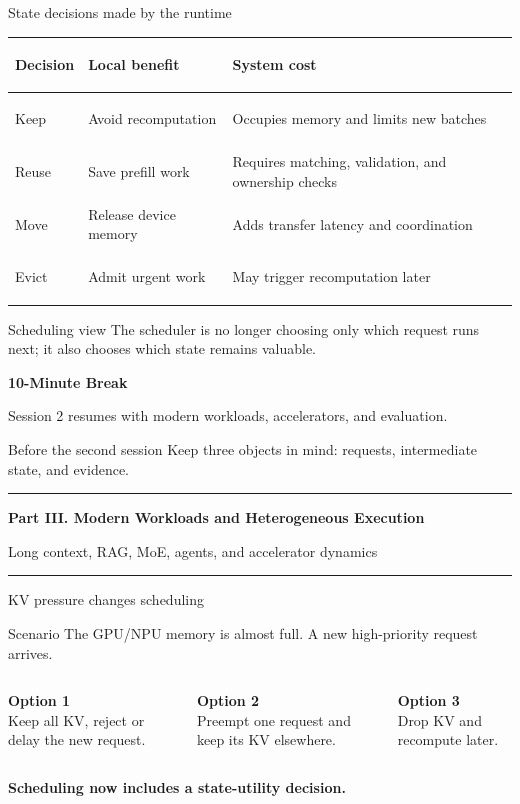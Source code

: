 \documentclass[aspectratio=169,11pt]{beamer}
\newcommand{\key}[1]{\textcolor{HUSTDeep}{\textbf{#1}}}
\newcommand{\topicsectionpage}[2]{%
  \begin{frame}[plain]
    \vspace{1.0cm}
    {\huge\bfseries\textcolor{HUSTBlue}{#1}}\par
    \vspace{0.26cm}
    {\large\textcolor{HUSTGray}{#2}}\par
    \vfill
    \textcolor{HUSTLine}{\rule{0.76\paperwidth}{0.8pt}}
  \end{frame}
}
\newcommand{\breakpage}{%
  \begin{frame}[plain]
    \vspace{1.0cm}
    {\huge\bfseries\textcolor{HUSTBlue}{10-Minute Break}}\par
    \vspace{0.28cm}
    {\Large\textcolor{HUSTGray}{Session 2 resumes with modern workloads, accelerators, and evaluation.}}\par
    \vspace{0.8cm}
    \begin{block}{Before the second session}
      Keep three objects in mind: requests, intermediate state, and evidence.
    \end{block}
    \vfill
    \textcolor{HUSTLine}{\rule{0.76\paperwidth}{0.8pt}}
  \end{frame}
}
\begin{document}
\begin{frame}{State decisions made by the runtime}
  \begin{tabularx}{\textwidth}{>{\bfseries\raggedright\arraybackslash}p{2.1cm}YY}
    \toprule
    Decision & Local benefit & System cost \\
    \midrule
    Keep & Avoid recomputation & Occupies memory and limits new batches \\
    Reuse & Save prefill work & Requires matching, validation, and ownership checks \\
    Move & Release device memory & Adds transfer latency and coordination \\
    Evict & Admit urgent work & May trigger recomputation later \\
    \bottomrule
  \end{tabularx}
  \vspace{0.28cm}
  \begin{block}{Scheduling view}
    The scheduler is no longer choosing only which request runs next; it also chooses which state remains valuable.
  \end{block}
\end{frame}

\breakpage

\topicsectionpage{Part III. Modern Workloads and Heterogeneous Execution}{Long context, RAG, MoE, agents, and accelerator dynamics}

\begin{frame}{KV pressure changes scheduling}
  \begin{block}{Scenario}
    The GPU/NPU memory is almost full. A new high-priority request arrives.
  \end{block}
  \begin{columns}[T,totalwidth=\textwidth]
    \begin{column}{0.34\textwidth}
      \textbf{\textcolor{HUSTBlue}{Option 1}}\\
      Keep all KV, reject or delay the new request.
    \end{column}
    \begin{column}{0.34\textwidth}
      \textbf{\textcolor{HUSTBlue}{Option 2}}\\
      Preempt one request and keep its KV elsewhere.
    \end{column}
    \begin{column}{0.30\textwidth}
      \textbf{\textcolor{HUSTBlue}{Option 3}}\\
      Drop KV and recompute later.
    \end{column}
  \end{columns}
  \vspace{0.35cm}
  \key{Scheduling now includes a state-utility decision.}
\end{frame}
\end{document}
